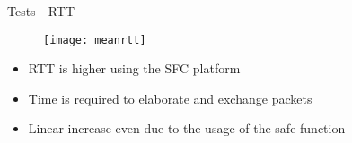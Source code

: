 \begin{frame}{Tests - RTT}

  \vspace{-1cm}

  \begin{figure}[H]
    \centering
    \texttt{[image: meanrtt]}
  \end{figure}

  \begin{itemize}
  \item RTT is higher using the SFC platform
  \item Time is required to elaborate and exchange packets
  \item Linear increase even due to the usage of the safe function
  \end{itemize}

\end{frame}